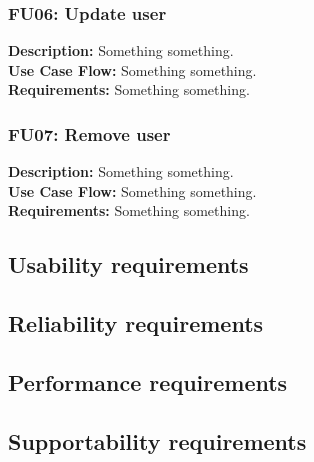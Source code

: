 \begin{adjustwidth}{2em}{0pt}
    \subsubsection*{FU06: Update user}
    \begin{adjustwidth}{1em}{0pt}
        \textbf{Description:}
        Something something.\\
        \textbf{Use Case Flow:}
        Something something.\\
        \textbf{Requirements:}
        Something something.
    \end{adjustwidth}
    
    \subsubsection*{FU07: Remove user}
    \begin{adjustwidth}{1em}{0pt}
        \textbf{Description:}
        Something something.\\
        \textbf{Use Case Flow:}
        Something something.\\
        \textbf{Requirements:}
        Something something.
    \end{adjustwidth}
\end{adjustwidth}

\subsection*{Usability requirements}


\subsection*{Reliability requirements}


\subsection*{Performance requirements}


\subsection*{Supportability requirements}


